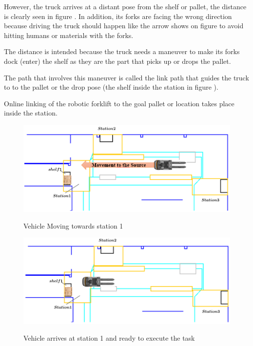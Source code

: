 However, the truck arrives at a distant pose from the shelf or pallet,
the distance is clearly seen in figure . In addition, its forks are facing the 
wrong direction because driving the truck should happen like the arrow shows on figure  
to avoid hitting humans or materials with the forks.

The distance is intended because the truck needs a maneuver to make its forks dock (enter) the shelf
as they are the part that picks up or drops the pallet.


The path that involves this maneuver is called the link path that guides the truck to to the pallet or the drop 
pose (the shelf inside the station in figure ). 

Online linking of the robotic forklift to the goal pallet or location takes place inside
the station.

\begin{figure}[H]
    \begin{center}
       \includegraphics[width=5in]{images/Chap0/move.png}\\
       \caption{Vehicle Moving towards station 1}
       \label{move}
       \end{center}
\end{figure}

\begin{figure}[H]
    \begin{center}
       \includegraphics[width=5in]{images/Chap0/arrive.png}\\
       \caption{Vehicle arrives at station 1 and ready to execute the task}
       \label{dock}
       \end{center}
\end{figure}

